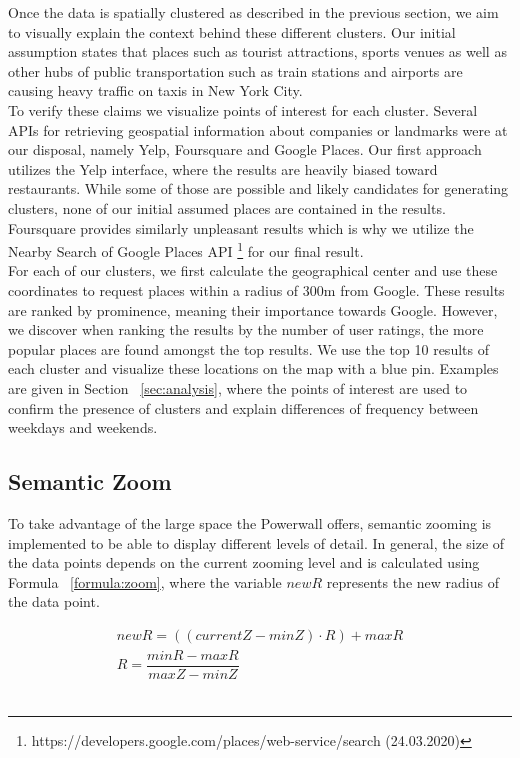 \documentclass[sigconf, authorversion, nonacm=true]{acmart}
\begin{document}
Once the data is spatially clustered as described in the previous section, we aim to visually explain the context behind these different clusters. Our initial assumption states that places such as tourist attractions, sports venues as well as other hubs of public transportation such as train stations and airports are causing heavy traffic on taxis in New York City.\\ 
To verify these claims we visualize points of interest for each cluster. Several APIs for retrieving geospatial information about companies or landmarks were at our disposal, namely Yelp, Foursquare and Google Places. Our first approach utilizes the Yelp interface, where the results are heavily biased toward restaurants. While some of those are possible and likely candidates for generating clusters, none of our initial assumed places are contained in the results. Foursquare provides similarly unpleasant results which is why we utilize the Nearby Search of Google Places API \footnote{https://developers.google.com/places/web-service/search (24.03.2020)} for our final result.\\
For each of our clusters, we first calculate the geographical center and use these coordinates to request places within a radius of 300m from Google. These results are ranked by prominence, meaning their importance towards Google. However, we discover when ranking the results by the number of user ratings, the more popular places are found amongst the top results. We use the top 10 results of each cluster and visualize these locations on the map with a blue pin. Examples are given in Section ~\ref{sec:analysis}, where the points of interest are used to confirm the presence of clusters and explain differences of frequency between weekdays and weekends.




\subsection{Semantic Zoom}
\label{sec:zoom}

To take advantage of the large space the Powerwall offers, semantic zooming is implemented to be able to display different levels of detail. In general, the size of the data points depends on the current zooming level and is calculated using Formula ~\ref{formula:zoom}, where the variable $newR$ represents the new radius of the data point.

\begin{align}
\label{formula:zoom}
newR = ((currentZ - minZ) \cdot R) + maxR\\
R = \dfrac{minR - maxR}{maxZ - minZ}
\end{align}\\
\end{document}
